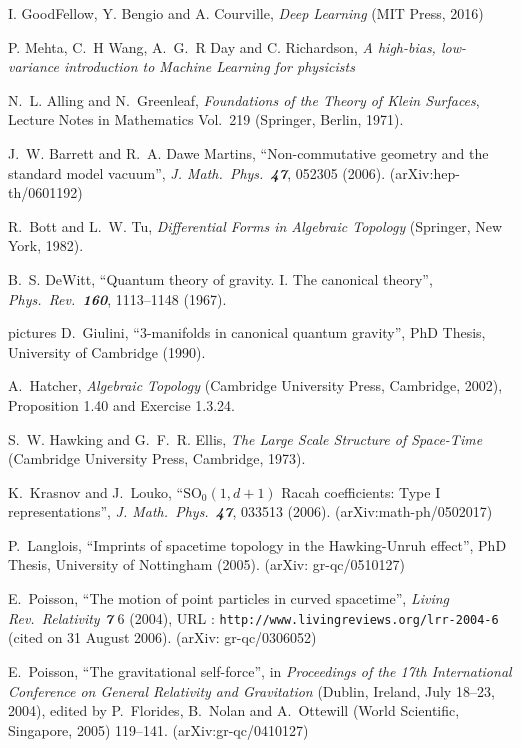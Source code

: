 \documentclass{SMLreport}
\begin{document}
\begin{thebibliography}{99} %

I. GoodFellow, Y. Bengio and A. Courville,
{\it Deep Learning \/}
(MIT Press, 2016)

P. Mehta, C.~H Wang, A.~G.~R Day and C. Richardson,
{\it A high-bias, low-variance introduction to Machine Learning for physicists \/}

N.~L. Alling and N.~Greenleaf,
{\it Foundations of the Theory of Klein Surfaces\/},
Lecture Notes in Mathematics Vol.~219
(Springer, Berlin, 1971).

J.~W. Barrett and R.~A. Dawe Martins,
``Non-commutative geometry and the standard model vacuum'',
{\it J. Math.\ Phys.\ \bf 47}, 052305 (2006).
(arXiv:hep-th/0601192)

R.~Bott and L.~W. Tu,
{\it Differential Forms in Algebraic Topology\/}
(Springer, New York, 1982).

B.~S. DeWitt,
``Quantum theory of gravity. I. The canonical theory'',
{\it Phys.\ Rev.\ \bf 160}, 1113--1148
(1967).

 pictures
D.~Giulini,
``3-manifolds in canonical quantum gravity'',
PhD Thesis,
University of Cambridge (1990).

A.~Hatcher,
{\it Algebraic Topology\/}
(Cambridge University Press, Cambridge, 2002),
Proposition 1.40 and Exercise 1.3.24.

S.~W. Hawking and G.~F.~R. Ellis,
{\it The Large Scale Structure of Space-Time\/}
(Cambridge University Press, Cambridge, 1973).

K.~Krasnov and J.~Louko,
``$\mathrm{SO}_0(1,d+1)$ Racah coefficients: Type I representations'',
{\it J. Math.\ Phys.\ \bf 47}, 033513 (2006).
(arXiv:math-ph/0502017)

P.~Langlois,
``Imprints of spacetime topology in the Hawking-Unruh effect'',
PhD Thesis, University of Nottingham (2005).
(arXiv: gr-qc/0510127)

E.~Poisson,
``The motion of point particles in curved spacetime'',
{\it Living Rev.\ Relativity \bf 7} 6 (2004),
URL : \texttt{http://www.livingreviews.org/lrr-2004-6} (cited on 31 August 2006).
(arXiv: gr-qc/0306052)

E.~Poisson,
``The gravitational self-force'',
in
{\it Proceedings of the
17th International Conference on General
Relativity and Gravitation\/} (Dublin, Ireland, July 18--23, 2004),
edited by
P.~Florides, B.~Nolan and A.~Ottewill
(World Scientific, Singapore, 2005) 119--141.
(arXiv:gr-qc/0410127)


\end{thebibliography}
\end{document}
